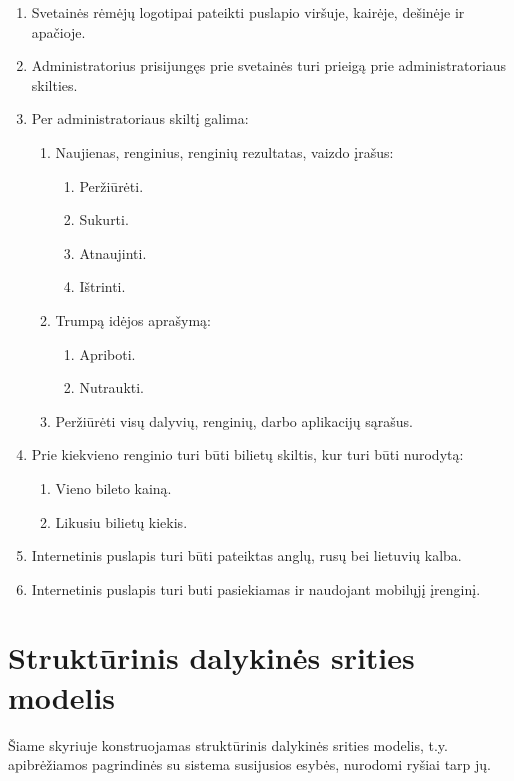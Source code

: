 \documentclass{VUMIFPSkursinis}
\begin{document}
\begin{enumerate}[label=\textbf{FR\arabic*}]
\begin{enumerate}[label*=\textbf{.\arabic*}]
					\end{enumerate}
				\item Svetainės rėmėjų logotipai pateikti puslapio viršuje, kairėje, dešinėje ir apačioje.
				\item Administratorius prisijungęs prie svetainės turi prieigą prie administratoriaus skilties.
				\item Per administratoriaus skiltį galima:
					\begin{enumerate}[label*=\textbf{.\arabic*}]
						\item Naujienas, renginius, renginių rezultatas, vaizdo įrašus:
						    \begin{enumerate}[label*=\textbf{.\arabic*}]
						        \item Peržiūrėti.
						        \item Sukurti.
						        \item Atnaujinti.
						        \item Ištrinti.
						    \end{enumerate}
						\item Trumpą idėjos aprašymą:
                            \begin{enumerate}[label*=\textbf{.\arabic*}]
						        \item Apriboti.
						        \item Nutraukti.
						    \end{enumerate}
						\item Peržiūrėti visų dalyvių, renginių, darbo aplikacijų sąrašus.
					\end{enumerate}
			    \item Prie kiekvieno renginio turi būti bilietų skiltis, kur turi būti nurodytą:
					\begin{enumerate}[label*=\textbf{.\arabic*}]
						\item Vieno bileto kainą.
						\item Likusiu bilietų kiekis.
					\end{enumerate}
				\item Internetinis puslapis turi būti pateiktas anglų, rusų bei lietuvių kalba.
				\item  Internetinis puslapis turi buti pasiekiamas ir naudojant mobilųjį įrenginį.
			\end{enumerate}

    \section{Struktūrinis dalykinės srities modelis} \label{strukturinisDSModelis}
		Šiame skyriuje konstruojamas struktūrinis dalykinės srities modelis, t.y. apibrėžiamos pagrindinės su sistema susijusios esybės, nurodomi ryšiai tarp jų.
\end{document}
